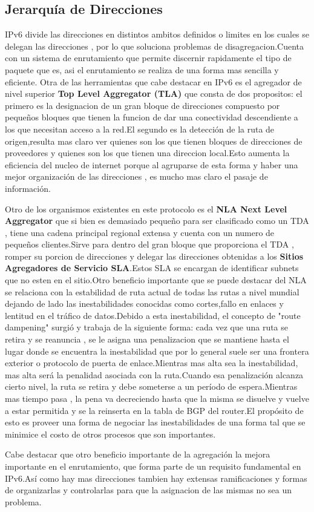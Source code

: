 \documentclass[11pt,a4paper]{article}
\begin{document}
\subsection{Jerarquía de Direcciones}
IPv6 divide las direcciones en distintos ambitos definidos o limites en los cuales se delegan las direcciones , por lo que soluciona problemas de disagregacion.Cuenta con un sistema de enrutamiento que permite discernir rapidamente el tipo de paquete que es, asi el enrutamiento se realiza de una forma mas sencilla y eficiente.
Otra de las herramientas que cabe destacar en IPv6 es el agregador de nivel superior \textbf{Top Level Aggregator (TLA)} que consta de dos propositos: el primero es la designacion de un gran bloque de direcciones compuesto por pequeños bloques que tienen la funcion de dar una conectividad descendiente a los que necesitan acceso a la red.El segundo es la detección de la ruta de origen,resulta mas claro ver quienes son los que tienen bloques de direcciones de proveedores y quienes son los que tienen una direccion local.Esto aumenta la eficiencia del nucleo de internet porque al agruparse de esta forma y haber una mejor organización de las direcciones , es mucho mas claro el pasaje de información.\par
Otro de los organismos existentes en este protocolo es el \textbf{NLA Next Level Aggregator} que si bien es demasiado pequeño para ser clasificado como un TDA , tiene una cadena principal regional extensa y cuenta con un numero de pequeños clientes.Sirve para dentro del gran bloque que proporciona el TDA , romper su porcion de direcciones y delegar las direcciones obtenidas a los \textbf{Sitios Agregadores de Servicio SLA}.Estos SLA se encargan de identificar subnets que no esten en el sitio.Otro beneficio importante que se puede destacar del NLA se relaciona con la estabilidad de ruta actual de todas las rutas a nivel mundial dejando de lado las inestabilidades conocidas como cortes,fallo en enlaces  y lentitud en el tráfico de datos.Debido a esta inestabilidad,  el concepto de "route dampening" surgió y trabaja de la siguiente forma: cada vez que una ruta se retira y se reanuncia , se le asigna una penalizacion que se mantiene hasta el lugar donde se encuentra la inestabilidad que por lo general suele ser una frontera exterior o  protocolo de puerta de enlace.Mientras mas alta sea la inestabilidad, mas alta será la penalidad asociada con la ruta.Cuando esa penalización alcanza cierto nivel, la ruta se retira y debe someterse a un período de espera.Mientras mas tiempo pasa , la pena va decreciendo hasta que la misma se disuelve y vuelve a estar permitida y se la reinserta en la tabla  de BGP del router.El propósito de esto es proveer una forma de negociar las inestabilidades de una forma tal que se minimice el costo de otros procesos que son importantes.\par
Cabe destacar que otro beneficio importante de la agregación la mejora importante en el enrutamiento, que forma parte de un requisito fundamental en IPv6.Así como hay mas direcciones tambien hay extensas ramificaciones y formas de organizarlas y controlarlas para que la asignacion de las mismas  no sea un problema.
\end{document}
